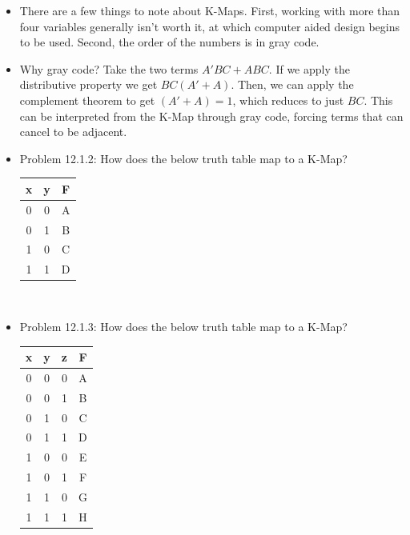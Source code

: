 \documentclass[10pt,a4paper]{article}
\begin{document}
\begin{itemize}
\\
\item There are a few things to note about K-Maps. First, working with more than four variables generally isn't worth it, at which computer aided design begins to be used. Second, the order of the numbers is in gray code. 
\item Why gray code? Take the two terms $A'BC+ABC$. If we apply the distributive property we get $BC(A'+A)$. Then, we can apply the complement theorem to get $(A'+A)=1$, which reduces to just $BC$. This can be interpreted from the K-Map through gray code, forcing terms that can cancel to be adjacent. 
\item Problem 12.1.2: How does the below truth table map to a K-Map?\\
\begin{tabular}{cc|c}
x & y & F\\
\hline
0 & 0 & A\\
0 & 1 & B\\
1 & 0 & C\\
1 & 1 & D\\
\end{tabular}\\
\item Problem 12.1.3: How does the below truth table map to a K-Map?\\
\begin{tabular}{ccc|c}
x & y & z & F\\
\hline
0 & 0 & 0 & A\\
0 & 0 & 1 & B\\
0 & 1 & 0 & C\\
0 & 1 & 1 & D\\
1 & 0 & 0 & E\\
1 & 0 & 1 & F\\
1 & 1 & 0 & G\\
1 & 1 & 1 & H\\
\end{tabular}\\
\begin{tikzpicture}

\end{tikzpicture}
\end{itemize}
\end{document}

